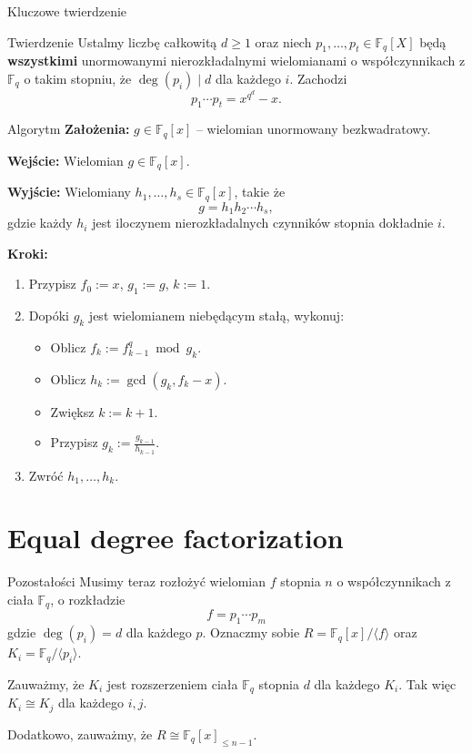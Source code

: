 \documentclass{beamer}
\begin{document}
\begin{frame}{Kluczowe twierdzenie}
    \begin{block}{Twierdzenie}
        Ustalmy liczbę całkowitą $d \geq 1$ oraz niech $p_1, \ldots, p_t \in \mathbb{F}_q[X]$ będą 
        \textbf{wszystkimi} unormowanymi nierozkładalnymi wielomianami o współczynnikach z $\mathbb{F}_q$ o takim stopniu, że $\deg(p_i) \mid d$ dla każdego $i$.
        Zachodzi 
        $$p_1 \cdots p_t = x^{q^d} - x.$$
    \end{block}
\end{frame}

\begin{frame}{Algorytm}
 \textbf{Założenia:}  
\( g \in \mathbb{F}_q[x] \) – wielomian unormowany bezkwadratowy.

\textbf{Wejście:}  
Wielomian \( g \in \mathbb{F}_q[x] \).

\textbf{Wyjście:}  
Wielomiany \( h_1, \ldots, h_s \in \mathbb{F}_q[x] \), takie że  
\[
g = h_1 h_2 \cdots h_s,
\]
gdzie każdy \( h_i \) jest iloczynem nierozkładalnych czynników stopnia dokładnie \( i \).

\textbf{Kroki:}
\begin{enumerate}
    \item Przypisz \( f_0 := x \), \( g_1 := g \), \( k := 1 \).
    \item Dopóki \( g_k \) jest wielomianem niebędącym stałą, wykonuj:
    \begin{itemize}
        \item Oblicz \( f_k := f_{k-1}^q \bmod g_k \).
        \item Oblicz \( h_k := \gcd(g_k, f_k - x) \).
        \item Zwiększ \( k := k + 1 \).
        \item Przypisz \( g_k := \frac{g_{k-1}}{h_{k-1}} \).
    \end{itemize}
    \item Zwróć \( h_1, \ldots, h_{k} \).
\end{enumerate}
\end{frame}

\section{Equal degree factorization}
\begin{frame}{Pozostałości}
    Musimy teraz rozłożyć wielomian $f$ stopnia $n$ o współczynnikach z ciała $\mathbb{F}_q$, o rozkładzie 
    $$f = p_1 \cdots p_ m$$ gdzie $\deg (p_i) = d$ dla każdego $p$. 
    \pause 
    Oznaczmy sobie $R = \mathbb{F}_q[x]/\langle f \rangle$ oraz  $K_i = \mathbb{F}_q / \langle p_i \rangle$.
    
    Zauważmy, że $K_i$ jest rozszerzeniem ciała $\mathbb{F}_q$ stopnia $d$ dla każdego $K_i$. 
    Tak więc $K_i \cong K_j$ dla każdego $i,j$.

    Dodatkowo, zauważmy, że $R \cong \mathbb{F}_q[x]_{\leq n-1}.$
\end{frame}    
\end{document}
